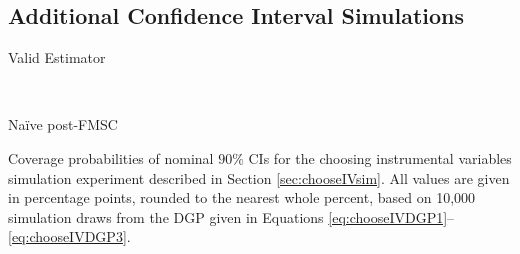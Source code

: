 \subsection{Additional Confidence Interval Simulations}
\label{sec:CIsupplement}
\begin{table}[h]
\footnotesize
\centering
	\begin{subtable}{0.48\textwidth}
		\caption{Valid Estimator}
		\label{tab:chooseIVsim_cover_Valid}
		
	\end{subtable}	
	~
	\begin{subtable}{0.48\textwidth}
		\caption{Na\"{i}ve post-FMSC}
		\label{tab:chooseIVsim_cover_naiveFMSC}
		
	\end{subtable}
	\caption{Coverage probabilities of nominal $90\%$ CIs for the choosing instrumental variables simulation experiment described in Section \ref{sec:chooseIVsim}. All values are given in percentage points, rounded to the nearest whole percent, based on 10,000 simulation draws from the DGP given in Equations \ref{eq:chooseIVDGP1}--\ref{eq:chooseIVDGP3}.}
\end{table}